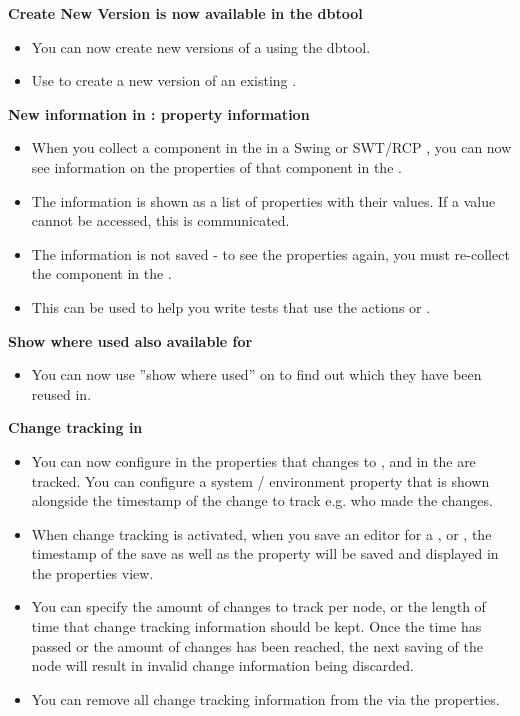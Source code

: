 \textbf{Create New Version is now available in the dbtool}
\begin{itemize}
\item You can now create new versions of a \gdproject{} using the dbtool.
\item Use  to create a new version of an existing \gdproject{}.
\end{itemize}

\textbf{New information in \gdomm{} : property information}
\begin{itemize}
\item When you collect a component in the \gdomm{} in a Swing or SWT/RCP \gdaut{}, you can now see information on the properties of that component in the \gdpropview{}.
\item The information is shown as a list of properties with their values. If a value cannot be accessed, this is communicated.
\item The information is not saved - to see the properties again, you must re-collect the component in the \gdomm{}.
\item This can be used to help you write tests that use the actions  or .
\end{itemize}

\textbf{Show where used also available for \gdsuites{}}
\begin{itemize}
\item You can now use ''show where used'' on \gdsuites{} to find out which \gdjobs{} they have been reused in.
\end{itemize}

\textbf{Change tracking in \gdprojects{}}
\begin{itemize}
\item You can now configure in the \gdproject{} properties that changes to \gdcases{}, \gdsuites{} and \gdjobs{} in the \gdproject{} are tracked. You can configure a system / environment property that is shown alongside the timestamp of the change to track e.g. who made the changes. 
\item When change tracking is activated, when you save an editor for a \gdcase{}, \gdsuite{} or \gdjob{}, the timestamp of the save as well as the property will be saved and displayed in the properties view.
\item You can specify the amount of changes to track per node, or the length of time that change tracking information should be kept. Once the time has passed or the amount of changes has been reached, the next saving of the node will result in invalid change information being discarded.
\item You can remove all change tracking information from the \gdproject{} via the \gdproject{} properties. 
\end{itemize}

